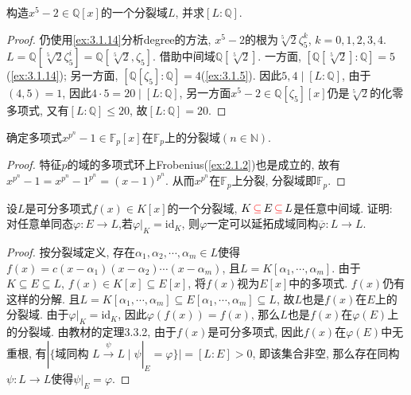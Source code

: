 \begin{problem}\label{ex:3.3.4}
    构造$x^5 - 2 \in \mathbb{Q}[x]$的一个分裂域$L$, 并求$[L:\mathbb{Q}]$.
\end{problem}

\begin{proof}
    仍使用\ref{ex:3.1.14}分析degree的方法, $x^5 - 2$的根为$\sqrt[5]{2}\zeta_5^k$, $k = 0, 1, 2, 3, 4$. $L = \mathbb{Q}\left[\sqrt[5]{2}\zeta_5^i\right] = \mathbb{Q}\left[\sqrt[5]{2}, \zeta_5\right]$. 借助中间域$\mathbb{Q}[\sqrt[5]{2}]$. 一方面, $\left[\mathbb{Q}[\sqrt[5]{2}]:\mathbb{Q}\right] = 5$(\ref{ex:3.1.14}); 另一方面, $\left[\mathbb{Q}[\zeta_5]:\mathbb{Q}\right] = 4$(\ref{ex:3.1.5}). 因此$5, 4 \mid [L:\mathbb{Q}]$, 由于$(4,5) = 1$, 因此$4 \cdot 5 = 20 \mid [L:\mathbb{Q}]$, 另一方面$x^5 - 2 \in \mathbb{Q}[\zeta_5][x]$仍是$\sqrt[5]{2}$的化零多项式, 又有$[L:\mathbb{Q}] \leqslant 20$, 故$[L:\mathbb{Q}] = 20$.
\end{proof}

\begin{problem}
    确定多项式$x^{p^n} - 1 \in \mathbb{F}_p[x]$在$\mathbb{F}_p$上的分裂域$(n \in \mathbb{N})$.
\end{problem}

\begin{proof}
    特征$p$的域的多项式环上Frobenius(\ref{ex:2.1.2})也是成立的, 故有$x^{p^n} - 1 = x^{p^n} - 1^{p^n} = (x - 1)^{p^n}$. 从而$x^{p^n}$在$\mathbb{F}_p$上分裂, 分裂域即$\mathbb{F}_p$.
\end{proof}

\begin{problem}\label{ex:3.3.6}
    设$L$是可分多项式$f(x) \in K[x]$的一个分裂域, $K \,\textcolor{red}{\subseteq}\, E \,\textcolor{red}{\subseteq}\, L$是任意中间域. 证明: 对任意单同态$\varphi:E \to L$,若$\varphi|_K = \mathrm{id}_K$, 则$\varphi$一定可以延拓成域同构$\overline\varphi:L \to L$.
\end{problem}

\begin{proof}
    按分裂域定义, 存在$\alpha_1, \alpha_2, \cdots, \alpha_m \in L$使得$f(x) = c(x - \alpha_1)(x - \alpha_2) \cdots (x - \alpha_m)$, 且$L = K[\alpha_1, \cdots, \alpha_m]$. 由于$K \subseteq E \subseteq L$, $f(x) \in K[x] \subseteq E[x]$, 将$f(x)$视为$E[x]$中的多项式. $f(x)$仍有这样的分解. 且$L = K[\alpha_1, \cdots, \alpha_m] \subseteq E[\alpha_1, \cdots, \alpha_m] \subseteq L$, 故$L$也是$f(x)$在$E$上的分裂域. 由于$\varphi|_K = \mathrm{id}_K$, 因此$\varphi(f(x)) = f(x)$, 那么$L$也是$f(x)$在$\varphi(E)$上的分裂域. 由教材的定理3.3.2, 由于$f(x)$是可分多项式, 因此$f(x)$在$\varphi(E)$中无重根, 有$|\{\text{域同构 } L \xrightarrow{\psi} L \mid \psi|_E = \varphi\}| = [L:E] > 0$, 即该集合非空, 那么存在同构$\psi:L \to L$使得$\psi|_E = \varphi$.
\end{proof}

